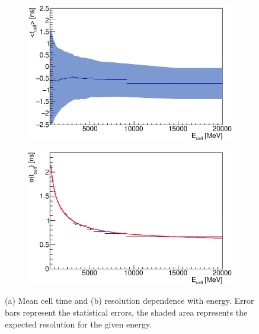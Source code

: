  
\begin{figure}[!tb]
  \begin{center}
    \begin{subfigure}{0.49\textwidth}
      \includegraphics[width=\textwidth]{TileTimingPerformance/Figures/e_mean.eps}
      \caption{}
      \label{fig:mean_vs_energy}
    \end{subfigure}
    \begin{subfigure}{0.49\textwidth}
      \includegraphics[width=\textwidth]{TileTimingPerformance/Figures/e_res.eps}
    \caption{}
    \label{fig:resolution_vs_energy}
    \end{subfigure}
  \end{center}
  \caption{(a) Mean cell time and (b) resolution dependence with
    energy. Error bars represent the statistical errors, the shaded area represents the expected resolution for the given energy.}
  \label{fig:e}
\end{figure}

